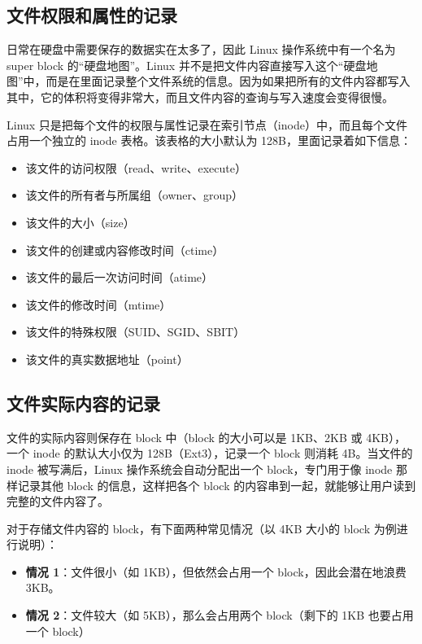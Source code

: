 \documentclass[12pt,UTF8]{ctexbook}
\begin{document}
\subsection{文件权限和属性的记录}

日常在硬盘中需要保存的数据实在太多了，因此 Linux 操作系统中有一个名为 super block 的“硬盘地图”。Linux 并不是把文件内容直接写入这个“硬盘地图”中，而是在里面记录整个文件系统的信息。因为如果把所有的文件内容都写入其中，它的体积将变得非常大，而且文件内容的查询与写入速度会变得很慢。

Linux 只是把每个文件的权限与属性记录在索引节点（inode）中，而且每个文件占用一个独立的 inode 表格。该表格的大小默认为 128B，里面记录着如下信息：

\begin{itemize}
    \item 该文件的访问权限（read、write、execute）
    \item 该文件的所有者与所属组（owner、group）
    \item 该文件的大小（size）
    \item 该文件的创建或内容修改时间（ctime）
    \item 该文件的最后一次访问时间（atime）
    \item 该文件的修改时间（mtime）
    \item 该文件的特殊权限（SUID、SGID、SBIT）
    \item 该文件的真实数据地址（point）
\end{itemize}

\subsection{文件实际内容的记录}

文件的实际内容则保存在 block 中（block 的大小可以是 1KB、2KB 或 4KB），一个 inode 的默认大小仅为 128B（Ext3），记录一个 block 则消耗 4B。当文件的 inode 被写满后，Linux 操作系统会自动分配出一个 block，专门用于像 inode 那样记录其他 block 的信息，这样把各个 block 的内容串到一起，就能够让用户读到完整的文件内容了。

对于存储文件内容的 block，有下面两种常见情况（以 4KB 大小的 block 为例进行说明）：

\begin{itemize}
    \item \textbf{情况 1}：文件很小（如 1KB），但依然会占用一个 block，因此会潜在地浪费 3KB。
    \item \textbf{情况 2}：文件较大（如 5KB），那么会占用两个 block（剩下的 1KB 也要占用一个 block）
\end{itemize}
\end{document}
